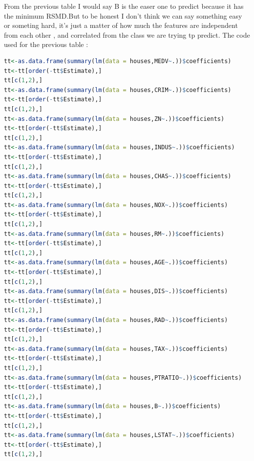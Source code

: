 \documentclass{article}
\begin{document}
From the previous table I would say B is the easer one to predict because it has the minimum RSMD.But to be honest I don't think we can say something easy or someting hard, it's just a matter of how much the features are independent from each other , and correlated from the class we are trying tp predict.
The code used for the previous table :
\begin{lstlisting}[language=R]
tt<-as.data.frame(summary(lm(data = houses,MEDV~.))$coefficients)
tt<-tt[order(-tt$Estimate),]
tt[c(1,2),]
tt<-as.data.frame(summary(lm(data = houses,CRIM~.))$coefficients)
tt<-tt[order(-tt$Estimate),]
tt[c(1,2),]
tt<-as.data.frame(summary(lm(data = houses,ZN~.))$coefficients)
tt<-tt[order(-tt$Estimate),]
tt[c(1,2),]
tt<-as.data.frame(summary(lm(data = houses,INDUS~.))$coefficients)
tt<-tt[order(-tt$Estimate),]
tt[c(1,2),]
tt<-as.data.frame(summary(lm(data = houses,CHAS~.))$coefficients)
tt<-tt[order(-tt$Estimate),]
tt[c(1,2),]
tt<-as.data.frame(summary(lm(data = houses,NOX~.))$coefficients)
tt<-tt[order(-tt$Estimate),]
tt[c(1,2),]
tt<-as.data.frame(summary(lm(data = houses,RM~.))$coefficients)
tt<-tt[order(-tt$Estimate),]
tt[c(1,2),]
tt<-as.data.frame(summary(lm(data = houses,AGE~.))$coefficients)
tt<-tt[order(-tt$Estimate),]
tt[c(1,2),]
tt<-as.data.frame(summary(lm(data = houses,DIS~.))$coefficients)
tt<-tt[order(-tt$Estimate),]
tt[c(1,2),]
tt<-as.data.frame(summary(lm(data = houses,RAD~.))$coefficients)
tt<-tt[order(-tt$Estimate),]
tt[c(1,2),]
tt<-as.data.frame(summary(lm(data = houses,TAX~.))$coefficients)
tt<-tt[order(-tt$Estimate),]
tt[c(1,2),]
tt<-as.data.frame(summary(lm(data = houses,PTRATIO~.))$coefficients)
tt<-tt[order(-tt$Estimate),]
tt[c(1,2),]
tt<-as.data.frame(summary(lm(data = houses,B~.))$coefficients)
tt<-tt[order(-tt$Estimate),]
tt[c(1,2),]
tt<-as.data.frame(summary(lm(data = houses,LSTAT~.))$coefficients)
tt<-tt[order(-tt$Estimate),]
tt[c(1,2),]
\end{lstlisting}
\end{document}
